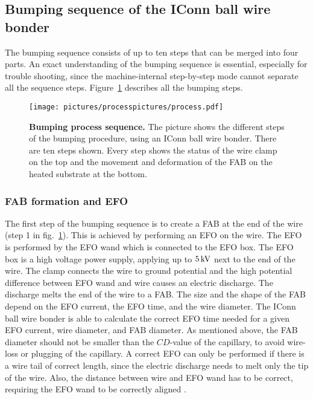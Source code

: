 \subsection{Bumping sequence of the IConn ball wire bonder}\label{sec:bumping_process}
The bumping sequence consists of up to ten steps that can be merged into four parts. An exact understanding of the bumping sequence is essential, especially for trouble shooting, since the machine-internal step-by-step mode cannot separate all the sequence steps. Figure~\ref{fig:bumping_process} describes all the bumping steps.
\begin{figure}
\begin{center}
\texttt{[image: pictures/processpictures/process.pdf]}
\end{center}
\caption[Bumping process sequence]{\textbf{Bumping process sequence.} The picture shows the different steps of the bumping procedure, using an IConn ball wire bonder. There are ten steps shown. Every step shows the status of the wire clamp on the top and the movement and deformation of the \ac{FAB} on the heated substrate at the bottom.}\label{fig:bumping_process}
\end{figure}

\subsubsection{\acl{FAB} formation and \acl{EFO}}
The first step of the bumping sequence is to create a \ac{FAB} at the end of the wire (step 1 in fig.~\ref{fig:bumping_process}). This is achieved by performing an \ac{EFO} on the wire. The \ac{EFO} is performed by the \ac{EFO} wand which is connected to the \ac{EFO} box. The \ac{EFO} box is a high voltage power supply, applying up to $5\,\rm{kV}$ next to the end of the wire. The clamp connects the wire to ground potential and the high potential difference between \ac{EFO} wand and wire causes an electric discharge. The discharge melts the end of the wire to a \ac{FAB}. The size and the shape of the \ac{FAB} depend on the \ac{EFO} current, the \ac{EFO} time, and the wire diameter. The IConn ball wire bonder is able to calculate the correct \ac{EFO} time needed for a given \ac{EFO} current, wire diameter, and \ac{FAB} diameter. As mentioned above, the \ac{FAB} diameter should not be smaller than the $CD$-value of the capillary, to avoid wire-loss or plugging of the capillary. A correct \ac{EFO} can only be performed if there is a wire tail of correct length, since the electric discharge needs to melt only the tip of the wire. Also, the distance between wire and \ac{EFO} wand has to be correct, requiring the \ac{EFO} wand to be correctly aligned%
.

